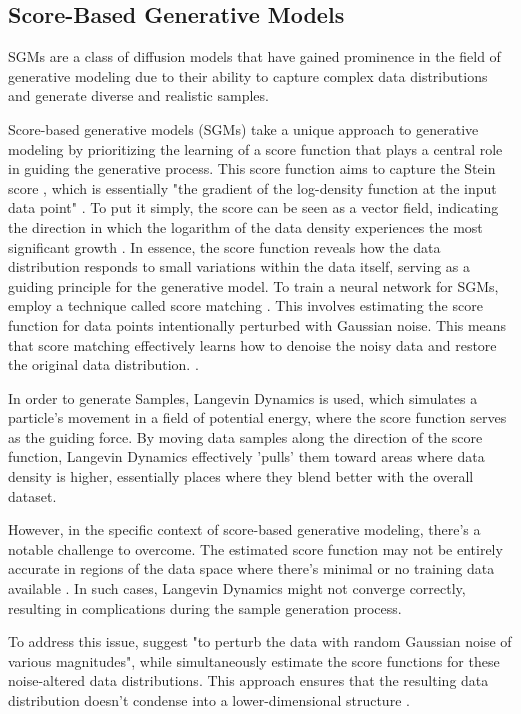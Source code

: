 \subsection{Score-Based Generative Models}
SGMs are a class of diffusion models that have gained prominence in the field of generative modeling due to their ability to capture complex data distributions and generate diverse and realistic samples.

Score-based generative models (SGMs) take a unique approach to generative modeling by prioritizing the learning of a score function that plays a central role in guiding the generative process. This score function aims to capture the Stein score \citep{steinScore}, which is essentially "the gradient of the log-density function at the input data point" \citep{song2019SGM}. To put it simply, the score can be seen as a vector field, indicating the direction in which the logarithm of the data density experiences the most significant growth \citep{song2019SGM}. In essence, the score function reveals how the data distribution responds to small variations within the data itself, serving as a guiding principle for the generative model. To train a neural network for SGMs, \cite{song2019SGM} employ a technique called score matching \citep{hyvarinenScoreMatching}. This involves estimating the score function for data points intentionally perturbed with Gaussian noise. This means that score matching effectively learns how to denoise the noisy data and restore the original data distribution. \citep{song2020improved}.

In order to generate Samples, Langevin Dynamics \citep{robertsLangevin} is used, which simulates a particle's movement in a field of potential energy, where the score function serves as the guiding force. By moving data samples along the direction of the score function, Langevin Dynamics effectively 'pulls' them toward areas where data density is higher, essentially places where they blend better with the overall dataset.

However, in the specific context of score-based generative modeling, there's a notable challenge to overcome. The estimated score function may not be entirely accurate in regions of the data space where there's minimal or no training data available \citep{song2019SGM}. In such cases, Langevin Dynamics might not converge correctly, resulting in complications during the sample generation process. 

To address this issue, \cite{song2019SGM} suggest "to perturb the data with random Gaussian noise of various magnitudes", while simultaneously estimate the score functions for these noise-altered data distributions. This approach ensures that the resulting data distribution doesn't condense into a lower-dimensional structure \citep{song2019SGM}.






